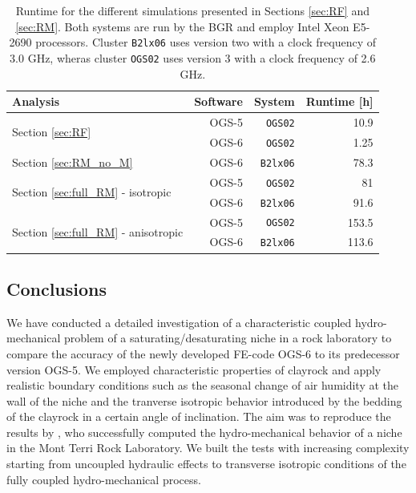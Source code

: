 \begin{table}
 \caption{Runtime for the different simulations presented in Sections \ref{sec:RF} and \ref{sec:RM}. Both systems are run by the BGR and employ Intel Xeon E5-2690 processors. Cluster \texttt{B2lx06} uses version two  with a clock frequency of 3.0 GHz, wheras cluster \texttt{OGS02} uses version 3 with a clock frequency of 2.6 GHz. \label{tab:runtime}}
\begin{center}
\begin{tabular}{ l | r | r | r  }
 Analysis		&  Software & System & Runtime [h]\\ 
 \hline
 \multirow{2}{*}{Section \ref{sec:RF}} 	& OGS-5 & \texttt{OGS02} & 10.9\\
 									& OGS-6 & \texttt{OGS02} &  1.25\\
 \hline 										
 Section \ref{sec:RM_no_M}	& OGS-6 & \texttt{B2lx06} & 78.3\\
 \hline
 \multirow{2}{*}{Section \ref{sec:full_RM} - isotropic} & OGS-5 & \texttt{OGS02} & 81\\
& OGS-6 & \texttt{B2lx06} & 91.6 \\
 \hline
 \multirow{2}{*}{Section  \ref{sec:full_RM} - anisotropic}  & OGS-5 & \texttt{OGS02} & 153.5\\
& OGS-6 & \texttt{B2lx06} & 113.6 \\
\end{tabular}
\end{center}
\end{table}

\subsection{Conclusions}

We have conducted a detailed investigation of a characteristic coupled hydro-mechanical problem of a saturating/desaturating niche in a rock laboratory to compare the accuracy of the newly developed FE-code OGS-6 to its predecessor version OGS-5. We employed characteristic properties of clayrock and apply realistic boundary conditions such as the seasonal change of air humidity  at the wall of the niche and the tranverse isotropic behavior introduced by the bedding of the clayrock in a certain angle of inclination. The aim was to reproduce the results by \cite{ziefle2018}, who successfully computed the hydro-mechanical behavior of a niche in the Mont Terri Rock Laboratory. We built the tests  with increasing complexity starting from uncoupled hydraulic effects to transverse isotropic conditions of the fully coupled hydro-mechanical process. 

